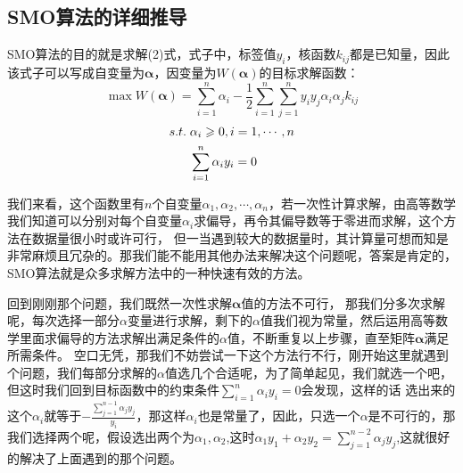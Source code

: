 \documentclass[UTF8]{ctexart}
\begin{document}
\subsection{SMO算法的详细推导}


SMO算法的目的就是求解(2)式，式子中，标签值$y_i$，核函数$k_{ij}$都是已知量，因此该式子可以写成自变量为$\boldsymbol \alpha$，因变量为$W(\boldsymbol\alpha)$的目标求解函数：
\[ \max W(\boldsymbol\alpha)= \sum_{i=1}^n \alpha_i - \frac{1}{2} \sum_{i=1}^n \sum_{j=1}^n y_i y_j \alpha_i \alpha_j k_{ij} \]
\begin{equation}\notag
    \begin{aligned}
        s.t.\; 
        &{\alpha_i \geqslant 0,i=1,\cdots,n } \\ 
        & \sum_{i=1}^n \alpha_i y_i = 0 
    \end{aligned}
\end{equation}

我们来看，这个函数里有$n$个自变量$\alpha_1,\alpha_2,\cdots,\alpha_n$，若一次性计算求解，由高等数学我们知道可以分别对每个自变量$\alpha_i$求偏导，再令其偏导数等于零进而求解，这个方法在数据量很小时或许可行，
但一当遇到较大的数据量时，其计算量可想而知是非常麻烦且冗杂的。那我们能不能用其他办法来解决这个问题呢，答案是肯定的，SMO算法就是众多求解方法中的一种快速有效的方法。

回到刚刚那个问题，我们既然一次性求解$\boldsymbol \alpha$值的方法不可行，
那我们分多次求解呢，每次选择一部分$\alpha$变量进行求解，剩下的$\alpha$值我们视为常量，然后运用高等数学里面求偏导的方法求解出满足条件的$\alpha$值，不断重复以上步骤，直至矩阵$\boldsymbol \alpha$满足所需条件。
空口无凭，那我们不妨尝试一下这个方法行不行，刚开始这里就遇到个问题，我们每部分求解的$\alpha$值选几个合适呢，为了简单起见，我们就选一个吧，但这时我们回到目标函数中的约束条件$\sum_{i=1}^n \alpha_i y_i = 0$会发现，这样的话
选出来的这个$\alpha_i$就等于$-\frac{\sum_{j=1}^{n-1} \alpha_j y_j}{y_i}$，那这样$\alpha_i$也是常量了，因此，只选一个$\alpha$是不可行的，那我们选择两个呢，假设选出两个为$\alpha_1,\alpha_2$,这时$ \alpha_1y_1 + \alpha_2y_2 = \sum_{j=1}^{n-2} \alpha_j y_j $,这就很好的解决了上面遇到的那个问题。
\end{document}
